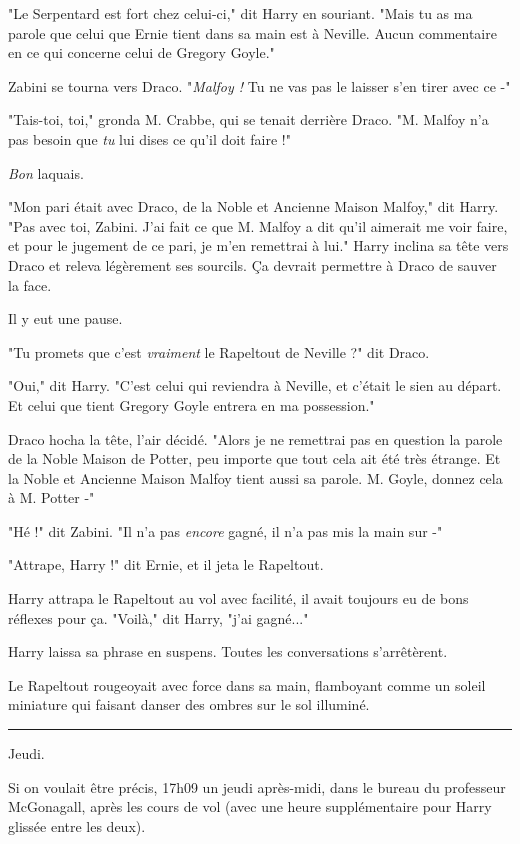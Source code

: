 "Le Serpentard est fort chez celui-ci," dit Harry en souriant. "Mais tu as ma parole que celui que Ernie tient dans sa main est à Neville. Aucun commentaire en ce qui concerne celui de Gregory Goyle."

Zabini se tourna vers Draco. "\emph{Malfoy !}  Tu ne vas pas le laisser s'en tirer avec ce -"

"Tais-toi, toi," gronda M. Crabbe, qui se tenait derrière Draco. "M. Malfoy n'a pas besoin que \emph{tu}  lui dises ce qu'il doit faire !"

\emph{Bon}  laquais.

"Mon pari était avec Draco, de la Noble et Ancienne Maison Malfoy," dit Harry. "Pas avec toi, Zabini. J'ai fait ce que M. Malfoy a dit qu'il aimerait me voir faire, et pour le jugement de ce pari, je m'en remettrai à lui." Harry inclina sa tête vers Draco et releva légèrement ses sourcils. Ça devrait permettre à Draco de sauver la face.

Il y eut une pause.

"Tu promets que c'est \emph{vraiment}  le Rapeltout de Neville ?" dit Draco.

"Oui," dit Harry. "C'est celui qui reviendra à Neville, et c'était le sien au départ. Et celui que tient Gregory Goyle entrera en ma possession."

Draco hocha la tête, l'air décidé. "Alors je ne remettrai pas en question la parole de la Noble Maison de Potter, peu importe que tout cela ait été très étrange. Et la Noble et Ancienne Maison Malfoy tient aussi sa parole. M. Goyle, donnez cela à M. Potter -"

"Hé !" dit Zabini. "Il n'a pas \emph{encore}  gagné, il n'a pas mis la main sur -"

"Attrape, Harry !" dit Ernie, et il jeta le Rapeltout.

Harry attrapa le Rapeltout au vol avec facilité, il avait toujours eu de bons réflexes pour ça. "Voilà," dit Harry, "j'ai gagné..."

Harry laissa sa phrase en suspens. Toutes les conversations s'arrêtèrent.

Le Rapeltout rougeoyait avec force dans sa main, flamboyant comme un soleil miniature qui faisant danser des ombres sur le sol illuminé.
\par\noindent\rule{\textwidth}{0.4pt}
Jeudi.

Si on voulait être précis, 17h09 un jeudi après-midi, dans le bureau du professeur McGonagall, après les cours de vol (avec une heure supplémentaire pour Harry glissée entre les deux).

